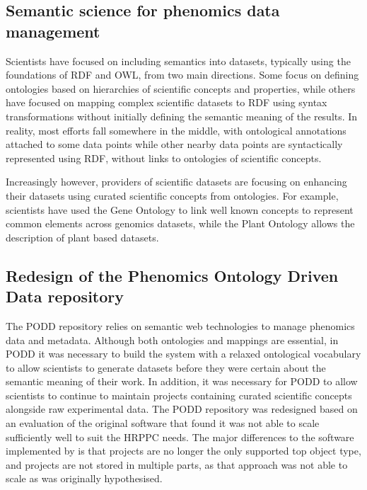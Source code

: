 \documentclass{llncs}
\begin{document}
\subsection{Semantic science for phenomics data management}
Scientists have focused on including semantics into datasets, typically using
the foundations of RDF and OWL, from two main directions. Some focus on defining
ontologies based on hierarchies of scientific concepts and properties, while
others have focused on mapping complex scientific datasets to RDF using syntax
transformations without initially defining the semantic meaning of the results.
In reality, most efforts fall somewhere in the middle, with ontological
annotations attached to some data points while other nearby data points are
syntactically represented using RDF, without links to ontologies of scientific
concepts.


Increasingly however, providers of scientific datasets are focusing on enhancing
their datasets using curated scientific concepts from ontologies. For example,
scientists have used the Gene Ontology \cite{Ashburner2000} to link well known concepts to
represent common elements across genomics datasets, while the Plant Ontology \cite{Avraham2008} 
allows the description of plant based datasets. 


\subsection{Redesign of the Phenomics Ontology Driven Data repository}
The PODD repository relies on semantic web technologies to
manage phenomics data and metadata. Although both ontologies and mappings are
essential, in PODD it was necessary to build the system with a relaxed
ontological vocabulary to allow scientists to generate datasets before they were
certain about the semantic meaning of their work. In addition, it was necessary
for PODD to allow scientists to continue to maintain projects containing curated
scientific concepts alongside raw experimental data. The PODD repository was 
redesigned based on an evaluation of the original software \cite{Li2010} that 
found it was not able to scale sufficiently well to suit the HRPPC needs. The 
major differences to the software implemented by \cite{Li2010} is that projects 
are no longer the only supported top object type, and projects are not stored 
in multiple parts, as that approach was not able to scale as was originally hypothesised.
\end{document}
